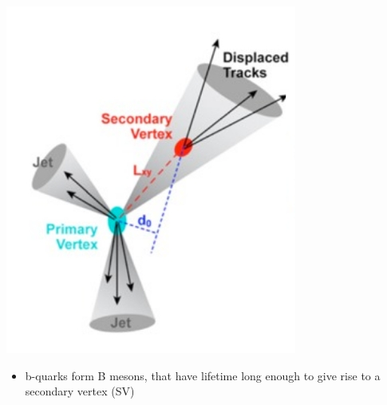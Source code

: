 \documentclass[9pt, xcolor=dvipsnames]{beamer}
\begin{document}
\begin{frame}
\begin{minipage}{.4\columnwidth}
\includegraphics[scale=0.2]{b}
\end{minipage}

\begin{itemize}
 \item b-quarks form B mesons, that have lifetime long enough to give rise
to a secondary vertex (SV)
\end{itemize}

\end{frame}
\end{document}
